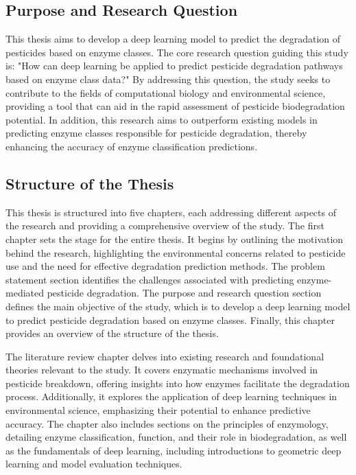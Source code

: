  
\subsection{Purpose and Research Question}
\label{sec:Objective}

This thesis aims to develop a deep learning model to predict the degradation of pesticides based on enzyme classes. The core research question guiding this study is: "How can deep learning be applied to predict pesticide degradation pathways based on enzyme class data?" By addressing this question, the study seeks to contribute to the fields of computational biology and environmental science, providing a tool that can aid in the rapid assessment of pesticide biodegradation potential. In addition, this research aims to outperform existing models in predicting enzyme classes responsible for pesticide degradation, thereby enhancing the accuracy of enzyme classification predictions.


\subsection{Structure of the Thesis}
\label{sec:Structure of the Thesis}
This thesis is structured into five chapters, each addressing different aspects of the research and providing a comprehensive overview of the study.
The first chapter sets the stage for the entire thesis. It begins by outlining the motivation behind the research, highlighting the environmental concerns related to pesticide use and the need for effective degradation prediction methods. The problem statement section identifies the challenges associated with predicting enzyme-mediated pesticide degradation. The purpose and research question section defines the main objective of the study, which is to develop a deep learning model to predict pesticide degradation based on enzyme classes. Finally, this chapter provides an overview of the structure of the thesis.

The literature review chapter delves into existing research and foundational theories relevant to the study. It covers enzymatic mechanisms involved in pesticide breakdown, offering insights into how enzymes facilitate the degradation process. Additionally, it explores the application of deep learning techniques in environmental science, emphasizing their potential to enhance predictive accuracy. The chapter also includes sections on the principles of enzymology, detailing enzyme classification, function, and their role in biodegradation, as well as the fundamentals of deep learning, including introductions to geometric deep learning and model evaluation techniques.

